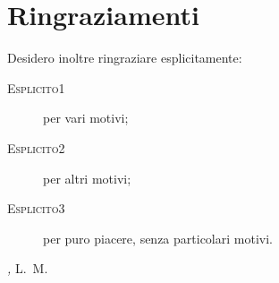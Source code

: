 %
%
\cleardoublepage
%
%
%
\chapter*{Ringraziamenti}
%
\lipsum[1]

\medskip

Desidero inoltre ringraziare esplicitamente:
\begin{description}
\item[{\scshape Esplicito1}] per vari motivi;
\item[{\scshape Esplicito2}] per altri motivi;
\item[{\scshape Esplicito3}] per puro piacere, senza particolari motivi.
\end{description}
%

\bigskip
 
\noindent\textit{\myLocation, \myTime}
\hfill L.~M.
%
